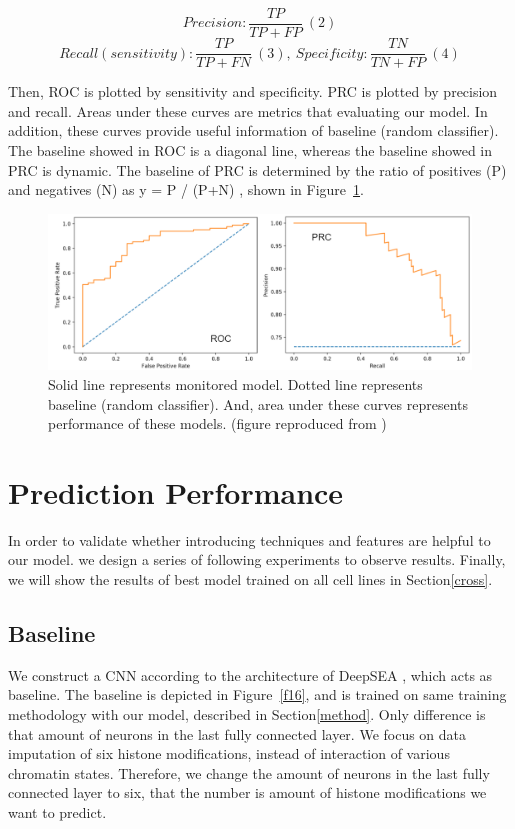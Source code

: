 \vspace{-1cm}
\[Precision : \frac{TP}{TP+FP}\ (2)\]
\[Recall(sensitivity) : \frac{TP}{TP+FN}\ (3),\ Specificity : \frac{TN}{TN+FP}\ (4)\]

Then, ROC is plotted by sensitivity and specificity. PRC is plotted by precision and recall. Areas under these curves are metrics that evaluating our model. In addition, these curves provide useful information of baseline (random classifier). The baseline showed in ROC is a diagonal line, whereas the baseline showed in PRC is dynamic. The baseline of PRC is determined by the ratio of positives (P) and negatives (N) as y = P / (P+N) \cite{saito2015precision}, shown in Figure~\ref{f15}.

\begin{figure}[H]
    \centering
    \includegraphics[width=1\columnwidth]{body/figure/figure15.png}
    \vspace{-1cm}
    \captionsetup{labelfont=bf}
    \renewcommand{\baselinestretch}{1.0}
    \caption[ROC and PRC]{Solid line represents monitored model. Dotted line represents baseline (random classifier). And, area under these curves represents performance of these models. (figure reproduced from \cite{rocprc})}
    \label{f15}
\end{figure}

\section{Prediction Performance} \label{performance}
In order to validate whether introducing techniques and features are helpful to our model. we design a series of following experiments to observe results. Finally, we will show the results of best model trained on all cell lines in Section\ref{cross}.

\subsection{Baseline}
We construct a CNN according to the architecture of DeepSEA \cite{zhou2015predicting}, which acts as baseline. The baseline is depicted in Figure~\ref{f16}, and is trained on same training methodology with our model, described in Section\ref{method}. Only difference is that amount of neurons in the last fully connected layer. We focus on data imputation of six histone modifications, instead of interaction of various chromatin states. Therefore, we change the amount of neurons in the last fully connected layer to six, that the number is amount of histone modifications we want to predict.


